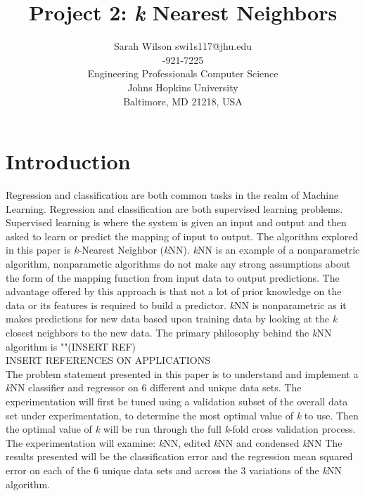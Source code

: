 \documentclass[twoside,11pt]{article}
\begin{document}
\title{Project 2: \textit{k} Nearest Neighbors}

\author{\name Sarah Wilson 
	   \email swi1s117@jhu.edu \\
	   -921-7225 \\
       \addr Engineering Professionals Computer Science\\
       Johns Hopkins University\\
       Baltimore, MD 21218, USA} 

\maketitle


\section{Introduction}
Regression and classification are both common tasks in the realm of Machine Learning. Regression and classification are both supervised learning problems. Supervised learning is where the system is given an input and output and then asked to learn or predict the mapping of input to output. The algorithm explored in this paper is \textit{k}-Nearest Neighbor (\textit{k}NN). \textit{k}NN is an example of a nonparametric algorithm, nonparametic algorithms do not make any strong assumptions about the form of the mapping function from input data to output predictions. The advantage offered by this approach is that not a lot of prior knowledge on the data or its features is required to build a predictor. \textit{k}NN is nonparametric as it makes predictions for new data based upon training data by looking at the \textit{k} closest neighbors to the new data. The primary philosophy behind the \textit{k}NN algorithm is ""(INSERT REF)\\ 

\hspace*{10mm} INSERT REFERENCES ON APPLICATIONS\\

\hspace*{10mm} The problem statement presented in this paper is to understand and implement a \textit{k}NN classifier and regressor on 6 different and unique data sets. The experimentation will first be tuned using a validation subset of the overall data set under experimentation, to determine the most optimal value of \textit{k} to use. Then the optimal value of \textit{k} will be run through the full \textit{k}-fold cross validation process. The experimentation will examine: \textit{k}NN, edited \textit{k}NN and condensed \textit{k}NN The results presented will be the classification error and the regression mean squared error on each of the 6 unique data sets and across the 3 variations of the  \textit{k}NN algorithm.\\
\end{document}
